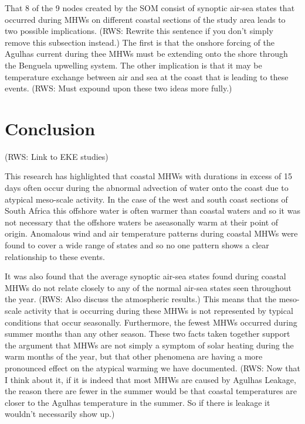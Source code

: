 \documentclass[a4paper,10pt,review]{elsarticle}
\begin{document}
That 8 of the 9 nodes created by the SOM consist of synoptic air-sea states that occurred during MHWs on different coastal sections of the study area leads to two possible implications. (RWS: Rewrite this sentence if you don't simply remove this subsection instead.) The first is that the onshore forcing of the Agulhas current during thee MHWs must be extending onto the shore through the Benguela upwelling system. The other implication is that it may be temperature exchange between air and sea at the coast that is leading to these events. (RWS: Must expound upon these two ideas more fully.)


\section{Conclusion}

(RWS: Link to EKE studies)

This research has highlighted that coastal MHWs with durations in excess of 15 days often occur during the abnormal advection of water onto the coast due to atypical meso-scale activity. In the case of the west and south coast sections of South Africa this offshore water is often warmer than coastal waters and so it was not necessary that the offshore waters be aseasonally warm at their point of origin. Anomalous wind and air temperature patterns during coastal MHWs were found to cover a wide range of states and so no one pattern shows a clear relationship to these events.

It was also found that the average synoptic air-sea states found during coastal MHWs do not relate closely to any of the normal air-sea states seen throughout the year. (RWS: Also discuss the atmospheric results.) This means that the meso-scale activity that is occurring during these MHWs is not represented by typical conditions that occur seasonally. Furthermore, the fewest MHWs occurred during summer months than any other season. These two facts taken together support the argument that MHWs are not simply a symptom of solar heating during the warm months of the year, but that other phenomena are having a more pronounced effect on the atypical warming we have documented. (RWS: Now that I think about it, if it is indeed that most MHWs are caused by Agulhas Leakage, the reason there are fewer in the summer would be that coastal temperatures are closer to the Agulhas temperature in the summer. So if there is leakage it wouldn't necessarily show up.)
\end{document}
